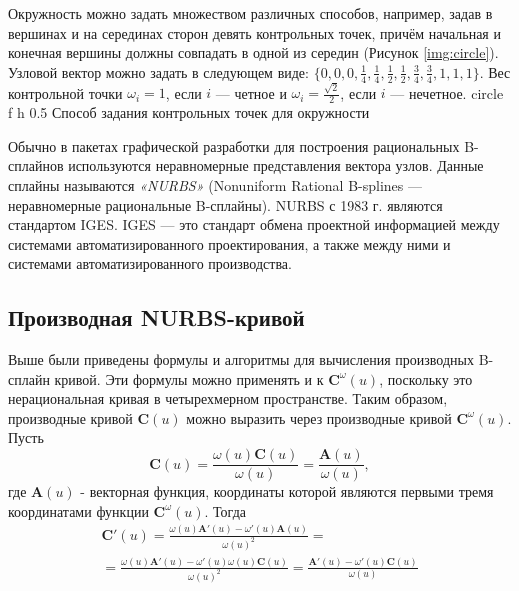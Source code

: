 \documentclass{bmstu}
\begin{document}
Окружность можно задать множеством различных способов, например, задав в вершинах и на серединах сторон девять контрольных точек, причём начальная и конечная вершины должны совпадать в одной из середин (Рисунок \ref{img:circle}). Узловой вектор можно задать в следующем виде: $\{0,0,0,\frac14, \frac14,\frac12,\frac12,\frac34,\frac34,1,1,1\}$. Вес контрольной точки $\omega_i=1$, если $i$ --- четное и $\omega_i=\frac{\sqrt2}2$, если $i$ --- нечетное.
{circle} %
{f} %
{h} %
{0.5\textwidth} %
{Способ задания контрольных точек для окружности} %

Обычно в пакетах графической разработки для построения рациональных
B-сплайнов используются неравномерные представления вектора узлов.
Данные сплайны называются \textit{«NURBS»} (Nonuniform Rational B-splines — неравномерные рациональные B-сплайны). NURBS с 1983 г. являются стандартом IGES. IGES --- это стандарт обмена проектной информацией между системами автоматизированного проектирования, а также между ними и системами автоматизированного производства.

\subsection{Производная NURBS-кривой}

Выше были приведены формулы и алгоритмы для вычисления производных B-сплайн кривой. Эти формулы можно применять и к $\mathbf{C}^\omega(u)$, поскольку это нерациональная кривая в четырехмерном пространстве. Таким образом, производные кривой $\mathbf{C}(u)$ можно выразить через производные кривой $\mathbf{C}^\omega(u)$.
Пусть
\begin{equation}
    \mathbf{C}(u) = \frac{\omega(u)\mathbf{C}(u)}{\omega(u)} = \frac{\mathbf{A}(u)}{\omega(u)},
\end{equation}
где $\mathbf{A}(u)$ - векторная функция, координаты которой являются первыми тремя координатами функции $\mathbf{C}^\omega(u)$.
Тогда
\begin{multline}
    \mathbf{C}'(u)=\frac{\omega(u)\mathbf{A}'(u)-\omega'(u)\mathbf{A}(u)}{\omega(u)^2}=\\=\frac{\omega(u)\mathbf{A}'(u)-\omega'(u)\omega(u)\mathbf{C}(u)}{\omega(u)^2}=\frac{\mathbf{A}'(u)-\omega'(u)\mathbf{C}(u)}{\omega(u)}
\end{multline}
\end{document}
